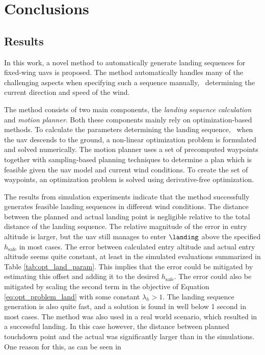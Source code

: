 \chapter{Conclusions}\label{cha:discussion}
\section{Results}
In this work, a novel method to automatically generate landing sequences for fixed-wing \acp{uav} is proposed. 
The method automatically handles many of the challenging aspects when specifying such a sequence manually, \eg\ determining the current 
direction and speed of the wind.

The method consists of two main components, the \textit{landing sequence calculation} and \textit{motion planner}. Both these components mainly rely on optimization-based methods. 
To calculate the parameters determining the landing sequence, \ie\ when the \ac{uav} descends to the ground, a non-linear optimization problem is 
formulated and solved numerically. The motion planner uses a set of precomputed waypoints together with sampling-based planning techniques to determine a plan which is feasible given the 
\ac{uav} model and current wind conditions. To create the set of waypoints, an optimization problem is solved using derivative-free optimization.

The results from simulation experiments indicate that the method successfully generates feasible landing 
sequences in different wind conditions. The distance between the planned and actual landing point is negligible relative to the total distance of the landing sequence.
The relative magnitude of the error in entry altitude is larger, but the \ac{uav} still manages to enter $\landing$ above the specified $h_{\text{safe}}$ in most cases. 
The error between calculated entry altitude and actual entry altitude seems quite constant, at least in the simulated evaluations summarized in Table \ref{tab:opt_land_param}. 
This implies that the error could be mitigated by estimating this offset and adding it to the desired $h_{\text{safe}}$. The error could also be mitigated by scaling the second term in the objective of 
Equation \ref{eq:opt_problem_land} with some constant $\lambda_h>1$. The landing sequence generation is also quite fast, and a solution is found in well below 1 second in most cases.
The method was also used in a real world scenario, which resulted in a successful landing. In this case however, the distance between planned touchdown point and the actual was significantly larger than 
in the simulations. One reason for this, as can be seen in 


